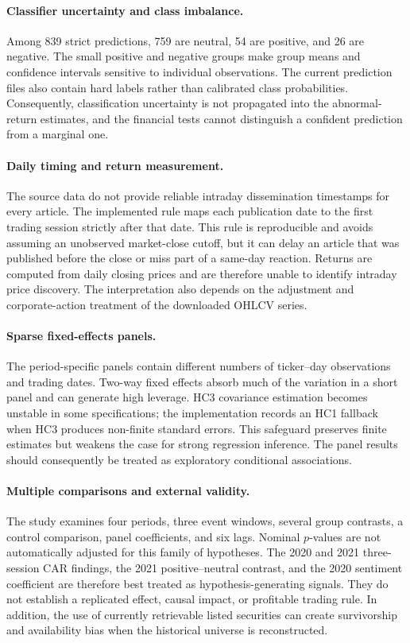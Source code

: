 \documentclass[12pt,a4paper]{article}
\begin{document}
\paragraph{Classifier uncertainty and class imbalance.}
Among 839 strict predictions, 759 are neutral, 54 are positive, and 26 are negative. The small positive and negative groups make group means and confidence intervals sensitive to individual observations. The current prediction files also contain hard labels rather than calibrated class probabilities. Consequently, classification uncertainty is not propagated into the abnormal-return estimates, and the financial tests cannot distinguish a confident prediction from a marginal one.

\paragraph{Daily timing and return measurement.}
The source data do not provide reliable intraday dissemination timestamps for every article. The implemented rule maps each publication date to the first trading session strictly after that date. This rule is reproducible and avoids assuming an unobserved market-close cutoff, but it can delay an article that was published before the close or miss part of a same-day reaction. Returns are computed from daily closing prices and are therefore unable to identify intraday price discovery. The interpretation also depends on the adjustment and corporate-action treatment of the downloaded OHLCV series.

\paragraph{Sparse fixed-effects panels.}
The period-specific panels contain different numbers of ticker--day observations and trading dates. Two-way fixed effects absorb much of the variation in a short panel and can generate high leverage. HC3 covariance estimation becomes unstable in some specifications; the implementation records an HC1 fallback when HC3 produces non-finite standard errors. This safeguard preserves finite estimates but weakens the case for strong regression inference. The panel results should consequently be treated as exploratory conditional associations.

\paragraph{Multiple comparisons and external validity.}
The study examines four periods, three event windows, several group contrasts, a control comparison, panel coefficients, and six lags. Nominal $p$-values are not automatically adjusted for this family of hypotheses. The 2020 and 2021 three-session CAR findings, the 2021 positive--neutral contrast, and the 2020 sentiment coefficient are therefore best treated as hypothesis-generating signals. They do not establish a replicated effect, causal impact, or profitable trading rule. In addition, the use of currently retrievable listed securities can create survivorship and availability bias when the historical universe is reconstructed.
\end{document}
